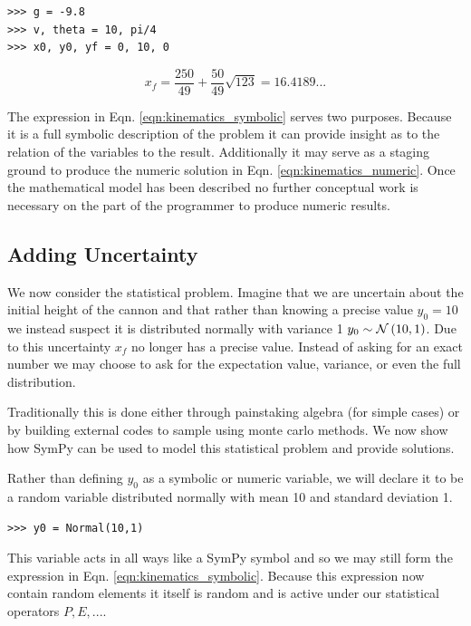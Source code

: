 \begin{lstlisting}
>>> g = -9.8
>>> v, theta = 10, pi/4
>>> x0, y0, yf = 0, 10, 0
\end{lstlisting}

\begin{equation}
\label{eqn:kinematics_numeric}
x_f = \frac{250}{49} + \frac{50}{49} \sqrt{123} = 16.4189...
\end{equation}

The expression in Eqn. \ref{eqn:kinematics_symbolic} serves two purposes. Because it is a full symbolic description of the problem it can provide insight as to the relation of the variables to the result. Additionally it may serve as a staging ground to produce the numeric solution in Eqn. \ref{eqn:kinematics_numeric}. Once the mathematical model has been described no further conceptual work is necessary on the part of the programmer to produce numeric results. 

\subsection{Adding Uncertainty}

We now consider the statistical problem. Imagine that we are uncertain about the initial height of the cannon and that rather than knowing a precise value $y_0 = 10$ we instead suspect it is distributed normally with variance 1 $y_0 \sim \mathcal{N}\left(10, 1\right)$. Due to this uncertainty $x_f$ no longer has a precise value. Instead of asking for an exact number we may choose to ask for the expectation value, variance, or even the full distribution. 

Traditionally this is done either through painstaking algebra (for simple cases) or by building external codes to sample using monte carlo methods. We now show how SymPy can be used to model this statistical problem and provide solutions. 

Rather than defining $y_0$ as a symbolic or numeric variable, we will declare it to be a random variable distributed normally with mean 10 and standard deviation 1. 
\begin{lstlisting}
>>> y0 = Normal(10,1)
\end{lstlisting}

This variable acts in all ways like a SymPy symbol and so we may still form the expression in Eqn. \ref{eqn:kinematics_symbolic}. Because this expression now contain random elements it itself is random and is active under our statistical operators $P,E, ...$.

